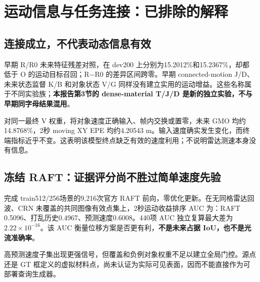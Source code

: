 \documentclass[UTF8,a4paper,11pt,fontset=none]{ctexart}
\begin{document}
\clearpage
\section{运动信息与任务连接：已排除的解释}
\subsection{连接成立，不代表动态信息有效}
早期 R/R0 未来特征残差对照，在 dev200 上分别为15.2012\%和15.2367\%，却都低于 O 的运动目标召回；R$-$R0 的差异区间跨零。早期 connected-motion J/D、未来状态监督 K/B 和对象状态 V/G 同样没有建立实用的运动增益。这些名称属于不同实验族；\textbf{本报告第3节的 dense-material T/J/D 是新的独立实验，不与早期同字母结果混用}。

对同一最终 V 权重，将对象速度正确输入、帧内交换或置零，未来 GMO 均约14.8768\%，2秒 moving XY EPE 均约4.20543 m。输入速度确实发生变化，而终端指标近乎不变。这表明该模型终点缺乏有效的速度利用；不说明雷达测速本身没有信息。

\subsection{冻结 RAFT：证据评分尚不胜过简单速度先验}
完成 train512/256场景的9,216次官方 RAFT 前向，零优化更新。在无同格雷达回波、CRN 未覆盖的共同图像有效点集上，2秒运动收益排序 AUC 为：RAFT 0.5096、打乱历史0.4967、预测速度0.6008。440项 AUC 独立复算最大差为$2.22\times10^{-16}$。该 AUC 衡量位移方案是否更有利，\textbf{不是未来占据 IoU，也不是光流准确率}。

高预测速度子集出现更强信号，但覆盖和负例对象权重不足以建立全局门控。源点还是 GT 框定义的虚拟材料点，尚未认证为实际可见表面，因而不能直接作为可部署查询生成器。
\end{document}

